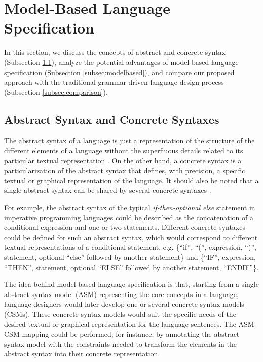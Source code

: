 \documentclass[preprint]{elsarticle}
\begin{document}
\section{Model-Based Language Specification} \label{sec:modelbased}

In this section, we discuss the concepts of abstract and concrete syntax (Subsection \ref{subsec:asmcsm}), analyze the potential advantages of model-based language specification (Subsection \ref{subsec:modelbased}), and compare our proposed approach with the traditional grammar-driven language design process (Subsection \ref{subsec:comparison}).

\subsection{Abstract Syntax and Concrete Syntaxes} \label{subsec:asmcsm}

The abstract syntax of a language is just a representation of the structure of the different elements of a language without the superfluous details related to its particular textual representation \cite{Kleppe2007}.
On the other hand, a concrete syntax is a particularization of the abstract syntax that defines, with precision, a specific textual or graphical representation of the language.
It should also be noted that a single abstract syntax can be shared by several concrete syntaxes \cite{Kleppe2007}.

For example, the abstract syntax of the typical \emph{if-then-optional else} statement in imperative programming languages could be described as the concatenation of a conditional expression and one or two statements.
Different concrete syntaxes could be defined for such an abstract syntax, which would correspond to different textual representations of a conditional statement, e.g. \{``if'', ``('', expression, ``)'', statement, optional ``else'' followed by another statement\} and \{``IF'', expression, ``THEN'', statement, optional ``ELSE'' followed by another statement, ``ENDIF''\}.

The idea behind model-based language specification is that, starting from a single abstract syntax model (ASM) representing the core concepts in a language, language designers would later develop one or several concrete syntax models (CSMs).
These concrete syntax models would suit the specific needs of the desired textual or graphical representation for the language sentences.
The ASM-CSM mapping could be performed, for instance, by annotating the abstract syntax model with the constraints needed to transform the elements in the abstract syntax into their concrete representation.
\end{document}
